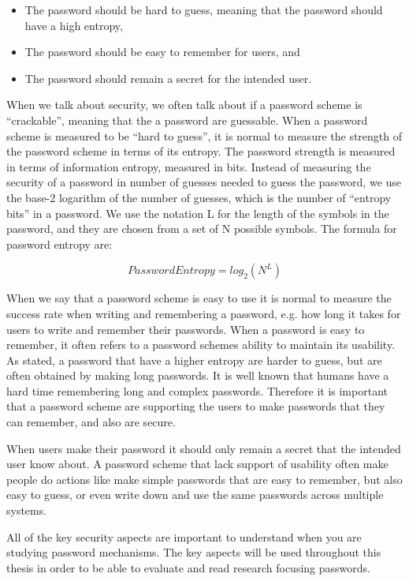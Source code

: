     \begin{itemize}
      \item The password should be hard to guess, meaning that the password should have a high entropy,
      \item The password should be easy to remember for users, and 
      \item The password should remain a secret for the intended user.
    \end{itemize}

  When we talk about security, we often talk about if a password scheme is ``crackable'', meaning that the a password are guessable. When a password scheme is measured to be ``hard to guess'', it is normal to measure the strength of the password scheme in terms of its entropy. The password strength is measured in terms of information entropy, measured in bits. Instead of measuring the security of a password in number of guesses needed to guess the password, we use the base-2 logarithm of the number of guesses, which is the number of ``entropy bits'' in a password. We use the notation L for the length of the symbols in the password, and they are chosen from a set of N possible symbols. The formula for password entropy are:

    \begin{equation}
      Password Entropy = log_{2}(N^{L})
    \end{equation}

  When we say that a password scheme is easy to use it is normal to measure the success rate when writing and remembering a password, e.g. how long it takes for users to write and remember their passwords. When a password is easy to remember, it often refers to a password schemes ability to maintain its usability. As stated, a password that have a higher entropy are harder to guess, but are often obtained by making long passwords. It is well known that humans have a hard time remembering long and complex passwords. Therefore it is important that a password scheme are supporting the users to make passwords that they can remember, and also are secure. 

  When users make their password it should only remain a secret that the intended user know about. A password scheme that lack support of usability often make people do actions like make simple passwords that are easy to remember, but also easy to guess, or even write down and use the same passwords across multiple systems. 

  All of the key security aspects are important to understand when you are studying password mechanisms. The key aspects will be used throughout this thesis in order to be able to evaluate and read research focusing passwords. 

